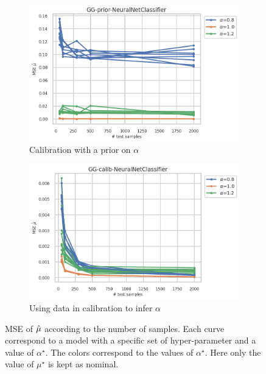\begin{figure}[ht!]
  \centering
  \begin{subfigure}[t]{0.49\linewidth}
    \includegraphics[width=\linewidth]{COMPARE/GG-prior/NeuralNetClassifier/profusion_n_samples_mse.png}
    \caption{Calibration with a prior on $\alpha$}
  \end{subfigure}%
  \hfill
  \begin{subfigure}[t]{0.49\linewidth}
    \includegraphics[width=\linewidth]{COMPARE/GG-calib/NeuralNetClassifier/profusion_n_samples_mse.png}
    \caption{Using data in calibration to infer $\alpha$}
  \end{subfigure}
  \caption{MSE of $\hat\mu$ according to the number of samples. Each curve correspond to a model with a specific set of hyper-parameter and a value of $\alpha^\star$. The colors correspond to the values of $\alpha^\star$. Here only the value of $\mu^\star$ is kept as nominal.}
  \label{fig:gg_baseline_compare_calib_n_samples_mse}
\end{figure}









